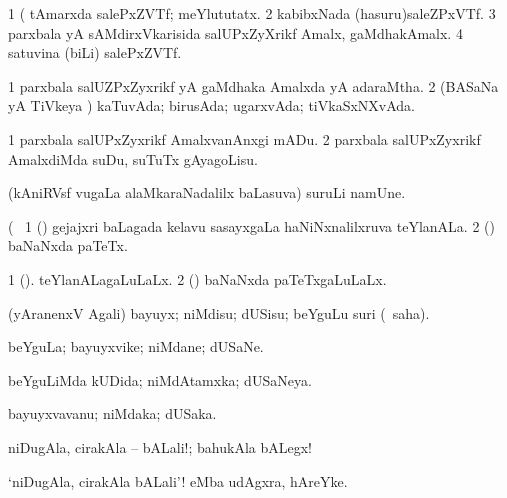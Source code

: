 \noindent 
\gl{\pagu}
\expl{}
\bmng
\bnum
\num{1}  (  tAmarxda salePxZVTf; meYlututatx. 
\num{2}  kabibxNada (hasuru)saleZPxVTf. 
\num{3}  parxbala yA sAMdirxVkarisida salUPxZyXrikf Amalx, gaMdhakAmalx. 
\num{4}  satuvina (biLi) salePxZVTf. 
\enum
\emng
\eentry

\bentry
{} 
\gl{\gu}
\expl{}
\bmng
\bnum
\num{1} parxbala salUZPxZyxrikf yA gaMdhaka Amalxda yA adaraMtha. 
\num{2} (BASaNa yA TiVkeya \vi) kaTuvAda; birusAda; ugarxvAda; tiVkaSxNXvAda. 
\enum
\emng
\eentry

\bentry 
{} 
\gl{\sakirx}
\expl{}
\bmng
\bnum
\num{1} parxbala salUPxZyxrikf AmalxvanAnxgi mADu. 
\num{2} parxbala salUPxZyxrikf AmalxdiMda suDu, suTuTx gAyagoLisu. 
\enum
\emng
\eentry

\bentry 
{} 
\gl{\nA}
\expl{}
\bmng
 (kAniRVsf \mo vugaLa alaMkaraNadalilx baLasuva) suruLi namUne. 
\emng
\eentry

\bentry 
{} 
\gl{\nA}(\bava\ 
\bmng
\bnum
\num{1} (\savi) gejajxri baLagada kelavu sasayxgaLa haNiNxnalilxruva teYlanALa. 
\num{2} (\pArxvi) baNaNxda paTeTx. 
\enum
\emng
\eentry

\bentry 
{} 
\gl{\gu}
\expl{}
\bmng
\bnum
\num{1} (\savi). teYlanALagaLuLaLx. 
\num{2} (\pArxvi) baNaNxda paTeTxgaLuLaLx. 
\enum
\emng
\eentry

\bentry
{} 
\gl{\sakirx}
\expl{}
\bmng
 (yAranenxV Agali) bayuyx; niMdisu; dUSisu; beYguLu suri (\akirx\ saha). 
\emng
\eentry

\bentry 
{} 
\gl{\nA}
\expl{}
\bmng
 beYguLa; bayuyxvike; niMdane; dUSaNe. 
\emng
\eentry

\bentry 
{} 
\gl{\gu}
\expl{}
\bmng
 beYguLiMda kUDida; niMdAtamxka; dUSaNeya. 
\emng
\eentry

\bentry 
{} 
\gl{\nA}
\expl{}
\bmng
 bayuyxvavanu; niMdaka; dUSaka. 
\emng
\eentry

\bentry
{} 
\gl{\BAavayx}
\expl{\It\ }
\bmng
niDugAla, cirakAla -- bALali!; bahukAla bALegx! 
\emng
\eentry

\bentry 
{} 
\gl{\nA}
\expl{\It}
\bmng
 `niDugAla, cirakAla bALali'! eMba udAgxra, hAreYke. 
\emng
\eentry

